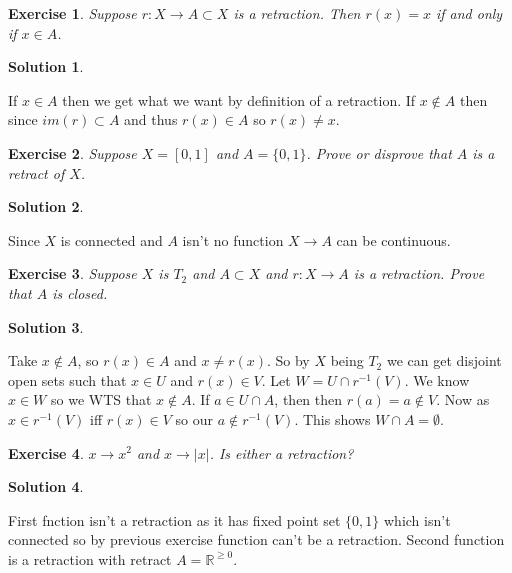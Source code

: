 \documentclass[11pt,a4paper]{article}
\newtheorem{Ex}{Exercise}
\newtheorem{Sol}{Solution}
\newcommand{\R}{\mathbb{R}}
\newcommand{\ra}{\rightarrow}
\begin{document}
\begin{Ex}
	Suppose $r: X \ra A \subset X$ is a retraction. Then $r(x) = x$ if and only if $x \in A$.
\end{Ex}

\begin{Sol}
\end{Sol}
\noindent If $x\in A$ then we get what we want by definition of a retraction. If $x\not \in A$ then since $im(r) \subset A$ and thus $r(x) \in A$ so $r(x) \neq x$. 

\begin{Ex}
	Suppose $X = [0,1]$ and $A = \{0,1\}$. Prove or disprove that $A$ is a retract of $X$.
\end{Ex}
\begin{Sol}\end{Sol}
\noindent Since $X$ is connected and $A$ isn't no function $X \ra A$ can be continuous.

\begin{Ex}
	Suppose $X$ is $T_2$ and $A \subset X$ and $r:X \ra A$ is a retraction. Prove that $A$ is closed.
\end{Ex}

\begin{Sol}\end{Sol}

\noindent Take $x \not \in A$, so $r(x) \in A$ and $x \neq r(x)$. So by $X$ being $T_2$ we can get disjoint open sets such that $x\in U$ and $r(x) \in V$. Let $W = U \cap r^{-1}(V)$. We know $x\in W$ so we WTS that $x \not \in A$. If $a \in U \cap A$, then then $r(a) = a \not \in V$. Now as $x \in r^{-1}(V)$ iff $r(x) \in V$ so our $a \not\in r^{-1}(V)$. This shows $W \cap A = \emptyset$.

\begin{Ex}
	$x \ra x^2$ and $x \ra |x|$. Is either a retraction? 
\end{Ex} 


\begin{Sol}
\end{Sol}
\noindent First fnction isn't a retraction as it has fixed point set $\{0,1\}$ which isn't connected so by previous exercise function can't be a retraction. Second function is a retraction with retract $A = \R^{\ge 0}$.
\end{document}
